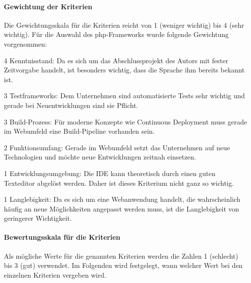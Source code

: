 \paragraph*{Gewichtung der Kriterien}
Die Gewichtungsskala für die Kriterien reicht von 1 (weniger wichtig) bis 4 (sehr wichtig). Für die Auswahl des php-Frameworks wurde folgende Gewichtung vorgenommen:

\begin{itemize*}
\item 4 Kenntnisstand: Da es sich um das Abschlussprojekt des Autors mit fester Zeitvorgabe handelt, ist besonders wichtig, dass die Sprache ihm bereits bekannt ist.
\item 3 Testframeworks: Dem Unternehmen sind automatisierte Tests sehr wichtig und gerade bei Neuentwicklungen sind sie Pflicht.
\item 3 Build-Prozess: Für moderne Konzepte wie Continuous Deployment muss gerade im Webumfeld eine Build-Pipeline vorhanden sein.
\item 2 Funktionsumfang: Gerade im Webumfeld setzt das Unternehmen auf neue Technologien und möchte neue Entwicklungen zeitnah einsetzen.
\item 1 Entwicklungsumgebung: Die IDE kann theoretisch durch einen guten Texteditor abgelöst werden. Daher ist dieses Kriterium nicht ganz so wichtig.
\item 1 Langlebigkeit: Da es sich um eine Webanwendung handelt, die wahrscheinlich häufig an neue Möglichkeiten angepasst werden muss, ist die Langlebigkeit von geringerer Wichtigkeit.
\end{itemize*}




\paragraph*{Bewertungsskala für die Kriterien}

Als mögliche Werte für die genannten Kriterien werden die Zahlen 1 (schlecht) bis 3 (gut) verwendet. Im Folgenden wird festgelegt, wann welcher Wert bei den einzelnen Kriterien vergeben wird.

